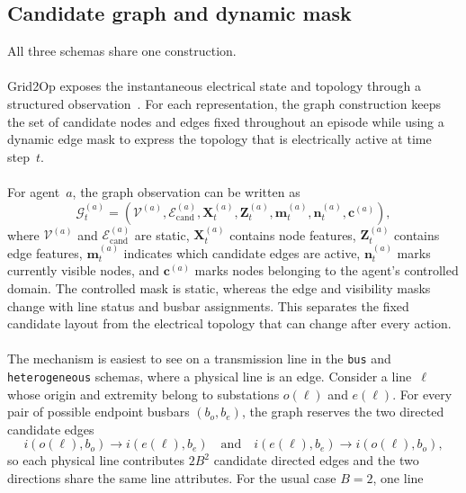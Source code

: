 \subsection{Candidate graph and dynamic mask}
\label{subsec:graph-candidate-edges}

All three schemas share one construction.
\\
\\
Grid2Op exposes the instantaneous electrical state and topology through a
structured observation~\cite{donnot2020grid2op}. For each representation,
the graph construction keeps the set of candidate nodes and edges fixed
throughout an episode while using a dynamic edge mask to express the topology
that is electrically active at time step~$t$.
\\
\\
For agent~$a$, the graph observation can be written as
\begin{equation}
  \mathcal{G}^{(a)}_t =
  \left(\mathcal{V}^{(a)},\mathcal{E}^{(a)}_{\mathrm{cand}},
  \mathbf{X}^{(a)}_t,\mathbf{Z}^{(a)}_t,
  \mathbf{m}^{(a)}_t,\mathbf{n}^{(a)}_t,
  \mathbf{c}^{(a)}\right),
  \label{eq:agent-graph-observation}
\end{equation}
where $\mathcal{V}^{(a)}$ and
$\mathcal{E}^{(a)}_{\mathrm{cand}}$ are static, $\mathbf{X}^{(a)}_t$ contains
node features, $\mathbf{Z}^{(a)}_t$ contains edge features,
$\mathbf{m}^{(a)}_t$ indicates which candidate edges are active,
$\mathbf{n}^{(a)}_t$ marks currently visible nodes, and
$\mathbf{c}^{(a)}$ marks nodes belonging to the agent's controlled domain.
The controlled mask is static, whereas the edge and visibility masks change
with line status and busbar assignments. This separates the fixed candidate
layout from the electrical topology that can change after every action.
\\
\\
The mechanism is easiest to see on a transmission line in the \texttt{bus} and
\texttt{heterogeneous} schemas, where a physical line is an edge. Consider a
line~$\ell$ whose origin and extremity
belong to substations $o(\ell)$ and $e(\ell)$. For every pair of possible
endpoint busbars $(b_o,b_e)$, the graph reserves the two directed candidate
edges
\begin{equation}
  i(o(\ell),b_o)\rightarrow i(e(\ell),b_e)
  \quad\text{and}\quad
  i(e(\ell),b_e)\rightarrow i(o(\ell),b_o),
  \label{eq:candidate-line-edges}
\end{equation}
so each physical line contributes $2B^2$ candidate directed edges and the two
directions share the same line attributes. For the usual case $B=2$, one line

